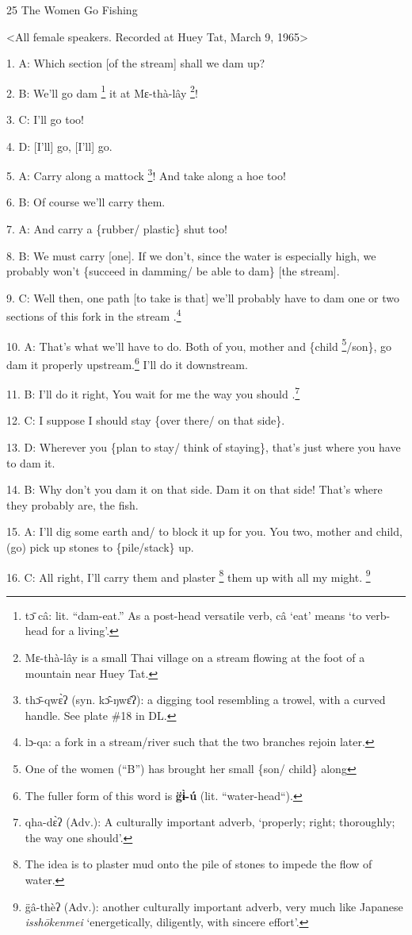 
25 The Women Go Fishing

<All female speakers. Recorded at Huey Tat, March 9, 1965>

1. A: Which section [of the stream] shall we dam up?

2. B: We'll go dam \footnote{tɔ̄ câ: lit. ``dam-eat.'' As a post-head versatile verb, câ `eat' means `to verb-head for a living'.} it at Mɛ-thà-lây \footnote{Mɛ-thà-lây is a small Thai village on a stream flowing at the foot of a mountain near Huey Tat.}!

3. C: I'll go too!

4. D: [I'll] go, [I'll] go.

5. A: Carry along a mattock \footnote{thɔ̄-qwɛ̀ʔ (syn. kɔ̂-ŋwɛ̂ʔ): a digging tool resembling a trowel, with a curved handle. See plate \#18 in DL.}! And take along a hoe too!

6. B: Of course we'll carry them.

7. A: And carry a \{rubber/ plastic\} shut too!

8. B: We must carry [one]. If we don't, since the water is especially high, we
probably won't \{succeed in damming/ be able to dam\} [the stream].

9. C: Well then, one path [to take is that] we'll probably have to dam one or two
sections of this fork in the stream .\footnote{lɔ-qa: a fork in a stream/river such that the two branches rejoin later.}

10. A: That's what we'll have to do. Both of you, mother and \{child \footnote{One of the women (``B'') has brought her small \{son/ child\} along}/son\},
go dam it properly upstream.\footnote{The fuller form of this word is \textbf{g̈ɨ̀-ú} (lit. ``water-head``).} I'll do it downstream.

11. B: I'll do it right, You wait for me the way you should .\footnote{qha-dɛ̀ʔ (Adv.): A culturally important adverb, `properly; right; thoroughly; the way one should'.}

12. C: I suppose I should stay \{over there/ on that side\}.

13. D: Wherever you \{plan to stay/ think of staying\}, that's just where you have
to dam it.

14. B: Why don't you dam it on that side. Dam it on that side! That's where they
probably are, the fish.

15. A: I'll dig some earth and/ to block it up for you.  You two, mother and child,
(go) pick up stones to \{pile/stack\} up.

16. C: All right, I'll carry them and plaster \footnote{The idea is to plaster mud onto the pile of stones to impede the flow of water.} them up with all my might. \footnote{g̈â-thèʔ (Adv.): another culturally important adverb, very much like Japanese \textit{isshōkenmei} `energetically, diligently, with sincere effort'.}

